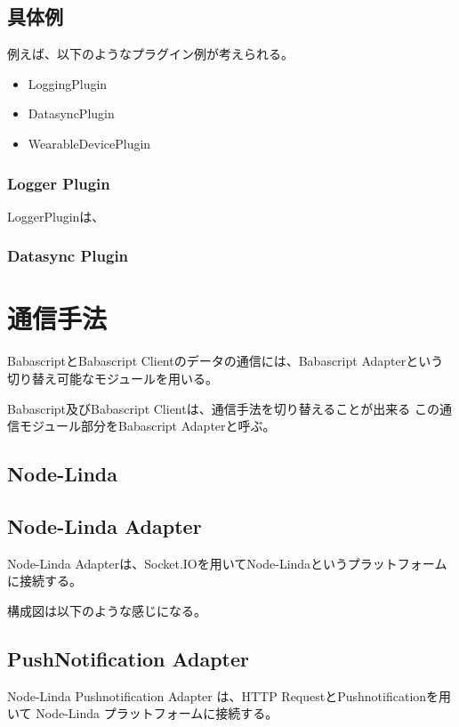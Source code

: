 \subsection{具体例}\label{ux5177ux4f53ux4f8b}

例えば、以下のようなプラグイン例が考えられる。

\begin{itemize}
\itemsep1pt\parskip0pt
\item
  LoggingPlugin
\item
  DatasyncPlugin
\item
  WearableDevicePlugin
\end{itemize}

\subsubsection{Logger Plugin}\label{logger-plugin}

LoggerPluginは、

\subsubsection{Datasync Plugin}\label{datasync-plugin}

\section{通信手法}\label{ux901aux4fe1ux624bux6cd5}

BabascriptとBabascript Clientのデータの通信には、Babascript
Adapterという切り替え可能なモジュールを用いる。

Babascript及びBabascript Clientは、通信手法を切り替えることが出来る
この通信モジュール部分をBabascript Adapterと呼ぶ。

\subsection{Node-Linda}\label{node-linda}

\subsection{Node-Linda Adapter}\label{node-linda-adapter}

Node-Linda
Adapterは、Socket.IOを用いてNode-Lindaというプラットフォームに接続する。

構成図は以下のような感じになる。

\subsection{PushNotification Adapter}\label{pushnotification-adapter}

Node-Linda Pushnotification Adapter は、HTTP
RequestとPushnotificationを用いて Node-Linda
プラットフォームに接続する。
